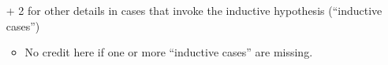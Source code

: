 \documentclass[11pt]{article}
\begin{document}
\begin{enumerate}
\begin{rubric}[induction]
\begin{itemize}
\item[+] 2 for other details in cases that invoke the inductive hypothesis (“inductive cases”)
\begin{itemize}\itemsep0pt
\item No credit here if one or more “inductive cases” are missing.
\end{itemize}
\end{itemize}
\end{rubric}

\end{enumerate}
\end{document}
